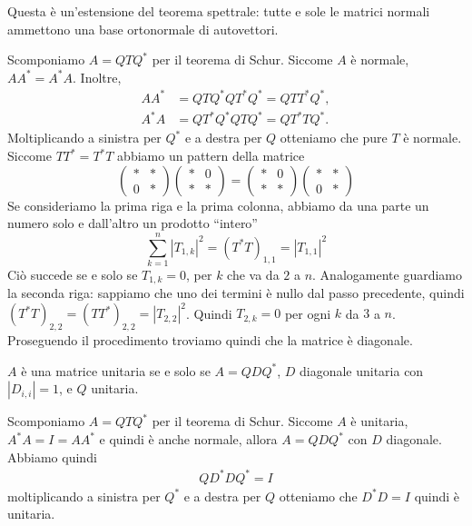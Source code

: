 \documentclass[a4paper]{article}
\begin{document}
Questa è un'estensione del teorema spettrale: tutte e sole le matrici
normali ammettono una base ortonormale di autovettori.

\begin{snippetproof}{}
    Scomponiamo \(A = QTQ^*\) per il teorema di Schur.
    Siccome \(A\) è normale, \(AA^* = A^*A\). Inoltre,
    \begin{align*}
        AA^* &= QTQ^*QT^*Q^* = QTT^*Q^*, \\
        A^*A &= QT^*Q^*QTQ^* = QT^*TQ^*.
    \end{align*}
    Moltiplicando a sinistra per \(Q^*\)
    e a destra per \(Q\) otteniamo che pure \(T\) è normale.
    Siccome \(TT^* = T^*T\) abbiamo un pattern della matrice
    \[
        \begin{pmatrix}
            \ast & \ast \\ 0 & \ast
        \end{pmatrix}
        \begin{pmatrix}
            \ast & 0 \\ \ast & \ast
        \end{pmatrix}
        =
        \begin{pmatrix}
            \ast & 0 \\ \ast & \ast
        \end{pmatrix}
        \begin{pmatrix}
            \ast & \ast \\ 0 & \ast
        \end{pmatrix}
    \]
    Se consideriamo la prima riga e la prima colonna, abbiamo
    da una parte un numero solo e dall'altro un prodotto ``intero''
    \[
        \sum_{k=1}^n |T_{1,k}|^2 = (T^*T)_{1,1} = |T_{1,1}|^2
    \]
    Ciò succede se e solo se \(T_{1,k} = 0\),
    per \(k\) che va da \(2\) a \(n\).
    Analogamente guardiamo la seconda riga: sappiamo che uno dei termini è nullo dal passo precedente,
    quindi \((T^*T)_{2,2} = (TT^*)_{2,2} = |T_{2,2}|^2\).
    Quindi \(T_{2,k} = 0\) per ogni \(k\) da \(3\) a \(n\).
    Proseguendo il procedimento troviamo quindi che la matrice è diagonale.
\end{snippetproof}

\begin{snippettheorem}{}
    \(A\) è una matrice unitaria
    se e solo se \(A = QDQ^*\), \(D\) diagonale
    unitaria con \(|D_{i,i}| = 1\), e \(Q\) unitaria.
\end{snippettheorem}

\begin{snippetproof}{}
    Scomponiamo \(A = QTQ^*\) per il teorema di Schur.
    Siccome \(A\) è unitaria, \(A^* A = I = A A^*\)
    e quindi è anche normale, allora \(A = QDQ^*\)
    con \(D\) diagonale. Abbiamo quindi
    \begin{align*}
        QD^* D Q^* = I
    \end{align*}
    moltiplicando a sinistra per \(Q^*\)
    e a destra per \(Q\) otteniamo che \(D^* D = I\) quindi è unitaria.
\end{snippetproof}
\end{document}

